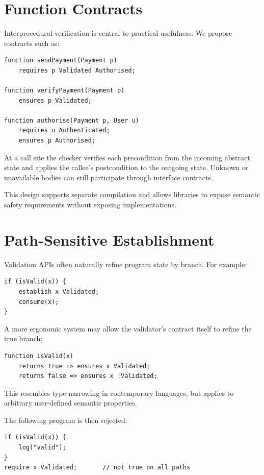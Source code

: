 \documentclass[11pt]{article}
\begin{document}
\section{Function Contracts}
Interprocedural verification is central to practical usefulness. We propose contracts such as:

\begin{lstlisting}
function sendPayment(Payment p)
    requires p Validated Authorised;

function verifyPayment(Payment p)
    ensures p Validated;

function authorise(Payment p, User u)
    requires u Authenticated;
    ensures p Authorised;
\end{lstlisting}

At a call site the checker verifies each precondition from the incoming abstract state and applies the callee's postcondition to the outgoing state. Unknown or unavailable bodies can still participate through interface contracts.

This design supports separate compilation and allows libraries to expose semantic safety requirements without exposing implementations.

\section{Path-Sensitive Establishment}
Validation APIs often naturally refine program state by branch. For example:

\begin{lstlisting}
if (isValid(x)) {
    establish x Validated;
    consume(x);
}
\end{lstlisting}

A more ergonomic system may allow the validator's contract itself to refine the true branch:

\begin{lstlisting}
function isValid(x)
    returns true => ensures x Validated;
    returns false => ensures x !Validated;
\end{lstlisting}

This resembles type narrowing in contemporary languages, but applies to arbitrary user-defined semantic properties.

The following program is then rejected:

\begin{lstlisting}
if (isValid(x)) {
    log("valid");
}
require x Validated;       // not true on all paths
\end{lstlisting}
\end{document}
